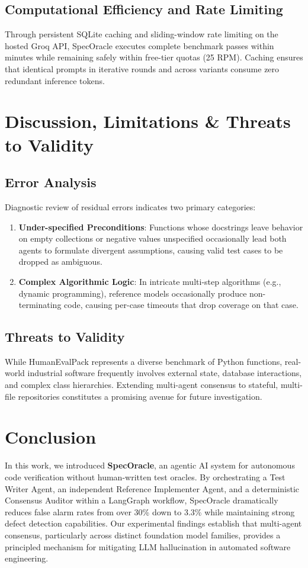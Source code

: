 \documentclass[conference]{IEEEtran}
\begin{document}
\subsection{Computational Efficiency and Rate Limiting}
Through persistent SQLite caching and sliding-window rate limiting on the hosted Groq API, SpecOracle executes complete benchmark passes within minutes while remaining safely within free-tier quotas (25 RPM). Caching ensures that identical prompts in iterative rounds and across variants consume zero redundant inference tokens.

\section{Discussion, Limitations \& Threats to Validity}

\subsection{Error Analysis}
Diagnostic review of residual errors indicates two primary categories:
\begin{enumerate}
    \item \textbf{Under-specified Preconditions}: Functions whose docstrings leave behavior on empty collections or negative values unspecified occasionally lead both agents to formulate divergent assumptions, causing valid test cases to be dropped as ambiguous.
    \item \textbf{Complex Algorithmic Logic}: In intricate multi-step algorithms (e.g., dynamic programming), reference models occasionally produce non-terminating code, causing per-case timeouts that drop coverage on that case.
\end{enumerate}

\subsection{Threats to Validity}
While HumanEvalPack represents a diverse benchmark of Python functions, real-world industrial software frequently involves external state, database interactions, and complex class hierarchies. Extending multi-agent consensus to stateful, multi-file repositories constitutes a promising avenue for future investigation.

\section{Conclusion}
In this work, we introduced \textbf{SpecOracle}, an agentic AI system for autonomous code verification without human-written test oracles. By orchestrating a Test Writer Agent, an independent Reference Implementer Agent, and a deterministic Consensus Auditor within a LangGraph workflow, SpecOracle dramatically reduces false alarm rates from over 30\% down to 3.3\% while maintaining strong defect detection capabilities. Our experimental findings establish that multi-agent consensus, particularly across distinct foundation model families, provides a principled mechanism for mitigating LLM hallucination in automated software engineering.



\end{document}
